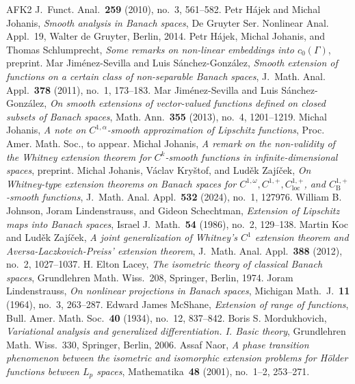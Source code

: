 \documentclass[a4paper,twoside,10pt,reqno,draft]{amsart}
\theoremstyle{definition}
\theoremstyle{remark}
\newcommand\Ga{\Gamma}
\begin{document}
\begin{thebibliography}{AFK2}
J.~Funct. Anal.~\textbf{259} (2010), no.~3, 561--582.
%
Petr Hájek and Michal Johanis,
\emph{Smooth analysis in Banach spaces},
De Gruyter Ser. Nonlinear Anal. Appl.~19, Walter de Gruyter, Berlin, 2014.
%
Petr Hájek, Michal Johanis, and Thomas Schlumprecht,
\emph{Some remarks on non-linear embeddings into $c_0(\Ga)$},
preprint.
%
Mar Jiménez-Sevilla and Luis Sánchez-González,
\emph{Smooth extension of functions on a certain class of non-separable Banach spaces},
J.~Math. Anal. Appl.~\textbf{378} (2011), no.~1, 173--183.
%
Mar Jiménez-Sevilla and Luis Sánchez-González,
\emph{On smooth extensions of vector-valued functions defined on closed subsets of Banach spaces},
Math. Ann.~\textbf{355} (2013), no.~4, 1201--1219.
%
Michal Johanis,
\emph{A note on $C^{1,\alpha}$-smooth approximation of Lipschitz functions},
Proc. Amer. Math. Soc., to appear.
%
Michal Johanis,
\emph{A remark on the non-validity of the Whitney extension theorem for $C^k$-smooth functions in infinite-dimensional spaces},
preprint.
%
Michal Johanis, Václav Kryštof, and Luděk Zajíček,
\emph{On Whitney-type extension theorems on Banach spaces for $C^{1,\omega}, C^{1,+}, C^{1,+}_{\mathrm{loc}}$, and $C^{1,+}_{\mathrm B}$-smooth functions},
J.~Math. Anal. Appl.~\textbf{532} (2024), no.~1, 127976.
%
William B. Johnson, Joram Lindenstrauss, and Gideon Schechtman,
\emph{Extension of Lipschitz maps into Banach spaces},
Israel J.~Math.~\textbf{54} (1986), no.~2, 129--138.
%
Martin Koc and Luděk Zajíček,
\emph{A joint generalization of Whitney's $C^1$ extension theorem and Aversa-Laczkovich-Preiss' extension theorem},
J.~Math. Anal. Appl.~\textbf{388} (2012), no.~2, 1027--1037.
%
H. Elton Lacey,
\emph{The isometric theory of classical Banach spaces},
Grundlehren Math. Wiss.~208, Springer, Berlin, 1974.
%
Joram Lindenstrauss,
\emph{On nonlinear projections in Banach spaces},
Michigan Math.~J.~\textbf{11} (1964), no.~3, 263--287.
%
Edward James McShane,
\emph{Extension of range of functions},
Bull. Amer. Math. Soc.~\textbf{40} (1934), no.~12, 837--842.
%
Boris S. Mordukhovich,
\emph{Variational analysis and generalized differentiation. I. Basic theory},
Grundlehren Math. Wiss.~330, Springer, Berlin, 2006.
%
Assaf Naor,
\emph{A phase transition phenomenon between the isometric and isomorphic extension problems for Hölder functions between $L_p$ spaces},
Mathematika~\textbf{48} (2001), no.~1--2, 253--271.

\end{thebibliography}
\end{document}
